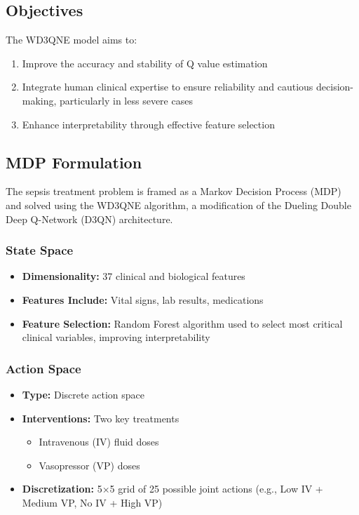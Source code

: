 \subsection*{Objectives}
The WD3QNE model aims to:
\begin{enumerate}
    \item Improve the accuracy and stability of Q value estimation
    \item Integrate human clinical expertise to ensure reliability and cautious decision-making, particularly in less severe cases
    \item Enhance interpretability through effective feature selection
\end{enumerate}

\subsection*{MDP Formulation}
The sepsis treatment problem is framed as a Markov Decision Process (MDP) and solved using the WD3QNE algorithm, a modification of the Dueling Double Deep Q-Network (D3QN) architecture.

\subsubsection*{State Space}
\begin{itemize}
    \item \textbf{Dimensionality:} 37 clinical and biological features
    \item \textbf{Features Include:} Vital signs, lab results, medications
    \item \textbf{Feature Selection:} Random Forest algorithm used to select most critical clinical variables, improving interpretability
\end{itemize}

\subsubsection*{Action Space}
\begin{itemize}
    \item \textbf{Type:} Discrete action space
    \item \textbf{Interventions:} Two key treatments
    \begin{itemize}
        \item Intravenous (IV) fluid doses
        \item Vasopressor (VP) doses
    \end{itemize}
    \item \textbf{Discretization:} 5×5 grid of 25 possible joint actions (e.g., Low IV + Medium VP, No IV + High VP)
\end{itemize}

